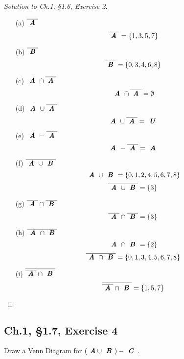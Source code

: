 \documentclass[12pt]{amsart}
\numberwithin{equation}{section}
\theoremstyle{definition}
\theoremstyle{remark}
\begin{document}
\begin{proof}[Solution to Ch.1, \S 1.6,  Exercise 2] \ \\

\begin{enumerate}
\item[(a)]
$ \overline{ \textbf{ \textit{A} } } $
$$
\overline{ \textbf{ \textit{A} } } = \{ 1, 3, 5, 7 \}
$$
\item[(b)]
$ \overline{ \textbf{ \textit{B} } } $
$$
\overline{ \textbf{ \textit{B} } } = \{ 0, 3, 4, 6, 8 \}
$$
\item[(c)]
$ \textbf{ \textit{A} } \cap \overline{ \textbf{ \textit{A} } } $
$$
\textbf{ \textit{A} } \cap \overline{ \textbf{ \textit{A} } } = \emptyset
$$
\item[(d)]
$ \textbf{ \textit{A} } \cup \overline{ \textbf{ \textit{A} } } $
$$
\textbf{ \textit{A} } \cup \overline{ \textbf{ \textit{A} } } = \textbf{ \textit{U} }
$$
\item[(e)]
$ \textbf{ \textit{A} } - \overline{ \textbf{ \textit{A} } } $
$$
\textbf{ \textit{A} } - \overline{ \textbf{ \textit{A} } } = \textbf{ \textit{A} }
$$
\item[(f)]
$ \overline{ \textbf{ \textit{A} } \cup \textbf{ \textit{B} } } $
$$
\textbf{ \textit{A} } \cup \textbf{ \textit{B} } = \{ 0, 1, 2, 4, 5, 6, 7, 8 \}
$$
$$
\overline{ \textbf{ \textit{A} } \cup \textbf{ \textit{B} } } = \{ 3 \}
$$
\item[(g)]
$ \overline{ \textbf{ \textit{A} } } \cap \overline{ \textbf{ \textit{B} } } $
$$
\overline{ \textbf{ \textit{A} } } \cap \overline{ \textbf{ \textit{B} } } = \{ 3 \}
$$
\item[(h)]
$ \overline{ \textbf{ \textit{A} } \cap \textbf{ \textit{B} } } $
$$
\textbf{ \textit{A} } \cap \textbf{ \textit{B} } = \{ 2 \}
$$
$$
\overline{ \textbf{ \textit{A} } \cap \textbf{ \textit{B} } } = \{ 0, 1, 3, 4, 5, 6, 7, 8 \}
$$
\item[(i)]
$ \overline{ \overline{ \textbf{ \textit{A} } } \cap \textbf{ \textit{B} } }
$
$$
\overline{ \overline{ \textbf{ \textit{A} } } \cap \textbf{ \textit{B} } } = \{ 1, 5, 7 \}
$$

\end{enumerate}

\end{proof}



\subsection*{Ch.1, \S 1.7,  Exercise 4} Draw a Venn Diagram for $ ( \textbf{ \textit{A}} \cup \textbf{ \textit{B} } ) - \textbf{ \textit{C} }$.
\end{document}
